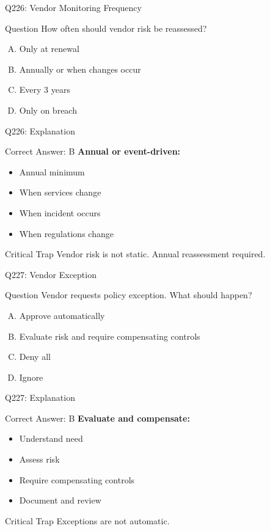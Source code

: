 \documentclass{beamer}
\begin{document}
	\begin{frame}{Q226: Vendor Monitoring Frequency}
		\begin{block}{Question}
			How often should vendor risk be reassessed?
		\end{block}
		\begin{enumerate}[(A)]
			\item Only at renewal
			\item Annually or when changes occur
			\item Every 3 years
			\item Only on breach
		\end{enumerate}
	\end{frame}
	
	\begin{frame}{Q226: Explanation}
		\begin{block}{Correct Answer: B}
			\textbf{Annual or event-driven:}
			\begin{itemize}
				\item Annual minimum
				\item When services change
				\item When incident occurs
				\item When regulations change
			\end{itemize}
		\end{block}
		\begin{alertblock}{Critical Trap}
			Vendor risk is not static.
			Annual reassessment required.
		\end{alertblock}
	\end{frame}
	
	\begin{frame}{Q227: Vendor Exception}
		\begin{block}{Question}
			Vendor requests policy exception. What should happen?
		\end{block}
		\begin{enumerate}[(A)]
			\item Approve automatically
			\item Evaluate risk and require compensating controls
			\item Deny all
			\item Ignore
		\end{enumerate}
	\end{frame}
	
	\begin{frame}{Q227: Explanation}
		\begin{block}{Correct Answer: B}
			\textbf{Evaluate and compensate:}
			\begin{itemize}
				\item Understand need
				\item Assess risk
				\item Require compensating controls
				\item Document and review
			\end{itemize}
		\end{block}
		\begin{alertblock}{Critical Trap}
			Exceptions are not automatic.
		\end{alertblock}
	\end{frame}
	
\end{document}
